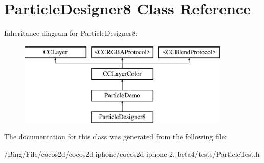 \hypertarget{interface_particle_designer8}{\section{Particle\-Designer8 Class Reference}
\label{interface_particle_designer8}
}
Inheritance diagram for Particle\-Designer8\-:\begin{figure}[H]
\begin{center}
\leavevmode
\includegraphics[height=4.000000cm]{interface_particle_designer8}
\end{center}
\end{figure}


The documentation for this class was generated from the following file\-:\begin{DoxyCompactItemize}
\item 
/\-Bing/\-File/cocos2d/cocos2d-\/iphone/cocos2d-\/iphone-\/2.-\/beta4/tests/Particle\-Test.\-h\end{DoxyCompactItemize}
